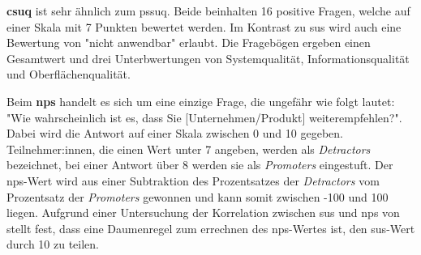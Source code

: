 \textbf{\ac{csuq}} ist sehr ähnlich zum \ac{pssuq}. Beide beinhalten 16 positive Fragen, welche auf
einer Skala mit 7 Punkten bewertet werden. Im Kontrast zu \ac{sus} wird auch eine Bewertung von
"nicht anwendbar" erlaubt. Die Fragebögen ergeben einen Gesamtwert und drei Unterbwertungen von
Systemqualität, Informationsqualität und Oberflächenqualität. \parencite{barnumUsabilityTesting2021}

Beim \textbf{\ac{nps}} handelt es sich um eine einzige Frage, die ungefähr wie folgt lautet: "Wie
wahrscheinlich ist es, dass Sie [Unternehmen/Produkt] weiterempfehlen?". Dabei wird die Antwort auf
einer Skala zwischen 0 und 10 gegeben. Teilnehmer:innen, die einen Wert unter 7 angeben, werden als
\textit{Detractors} bezeichnet, bei einer Antwort über 8 werden sie als \textit{Promoters}
eingestuft. Der \ac{nps}-Wert wird aus einer Subtraktion des Prozentsatzes der \textit{Detractors}
vom Prozentsatz der \textit{Promoters} gewonnen und kann somit zwischen -100 und 100 liegen.
 Aufgrund einer Untersuchung der Korrelation zwischen \ac{sus} und
\ac{nps} von \textcite{sauroDoesBetter2010} stellt \textcite{barnumUsabilityTesting2021} fest, dass
eine Daumenregel zum errechnen des \ac{nps}-Wertes ist, den \ac{sus}-Wert durch 10 zu teilen.
